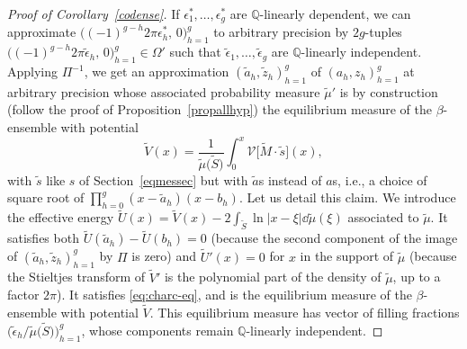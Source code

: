 \documentclass[10pt,a4paper]{amsart}
\numberwithin{equation}{section}
\begin{document}
\begin{proof}[Proof of Corollary~\ref{codense}]
If $\epsilon_1^*,\ldots,\epsilon_g^*$ are $\mathbb{Q}$-linearly dependent, we can approximate $\bigl((-1)^{g-h}2\pi \epsilon_h^* ,\,0\bigr)_{h = 1}^{g}$ to arbitrary precision by $2g$-tuples $\bigl((-1)^{g-h}2\pi \tilde{\epsilon}_h ,\,0\bigr)_{h = 1}^{g} \in \Omega'$ such that $\tilde{\epsilon}_1,\ldots,\tilde{\epsilon}_g$ are $\mathbb{Q}$-linearly independent. Applying $\Pi^{-1}$, we get an approximation $(\tilde{a}_h,\tilde{z}_h)_{h = 1}^{g}$ of $(a_h,z_h)_{h = 1}^{g}$ at arbitrary precision whose associated probability measure $\tilde{\mu}'$ is by construction (follow the proof of Proposition~\ref{propallhyp}) the equilibrium measure of the $\beta$-ensemble with potential
\[
\tilde{V}(x) = \frac{1}{\tilde{\mu}\big(\tilde{S}\big)} \int_0^{x} \mathcal{V}\bigl[\tilde{M}\cdot \tilde{s}\bigr](x),
\]
with $\tilde{s}$ like $s$ of Section~\ref{eqmessec} but with
$\tilde{a}$s instead of $a$s, i.e., a choice of square root of
$\prod_{h = 0}^{g}(x - \tilde{a}_{h})(x - b_{h})$. Let us detail this
claim. We introduce the effective energy
$\tilde{U}(x) = \tilde{V}(x) - 2\int_{\tilde{S}}\ln|x - \xi| \dd \tilde{\mu}(\xi)$
associated to $\tilde{\mu}$. It satisfies both
$\tilde{U}(\tilde{a}_{h}) - \tilde{U}(b_{h}) = 0$
(because the second component of the image of
$(\tilde{a}_{h}, \tilde{z}_{h})_{h=1}^{g}$ by $\Pi$ is zero) and
$\tilde{U}'(x) = 0$ for $x$ in the support of $\tilde{\mu}$ (because the Stieltjes
transform of $\tilde{V}'$ is the polynomial part of the density of
$\tilde{\mu}$, up to a factor $2\pi$). It satisfies \eqref{eq:charc-eq},
and is the equilibrium measure of the $\beta$-ensemble with potential
$\tilde{V}$. This equilibrium measure has vector of filling fractions
$\bigl(\tilde{\epsilon}_h/\tilde{\mu}\big(\tilde{S}\big)\bigr)_{h = 1}^{g}$, whose components
remain $\mathbb{Q}$-linearly independent.
\end{proof}
\end{document}
